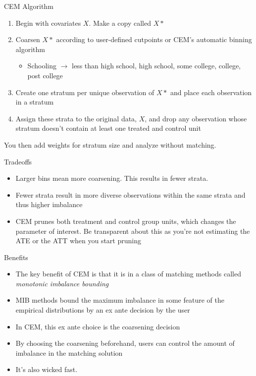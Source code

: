 \documentclass{beamer}
\begin{document}
\begin{frame}{CEM Algorithm}
	
\begin{enumerate}
\item Begin with covariates $X$. Make a copy called $X*$
\item Coarsen $X*$ according to user-defined cutpoints or CEM's automatic binning algorithm
	\begin{itemize}
	\item Schooling $\rightarrow$ less than high school, high school, some college, college, post college
	\end{itemize}
\item Create one stratum per unique observation of $X*$ and place each observation in a stratum
\item Assign these strata to the original data, $X$, and drop any observation whose stratum doesn't contain at least one treated and control unit
\end{enumerate}

You then add weights for stratum size and analyze without matching.

\end{frame}

\begin{frame}{Tradeoffs}
	
	\begin{itemize}
	\item Larger bins mean more coarsening.  This results in fewer strata.  
	\item Fewer strata result in more diverse observations within the same strata and thus higher imbalance
	\item CEM prunes both treatment and control group units, which changes the parameter of interest.  Be transparent about this as you're not estimating the ATE or the ATT when you start pruning
	\end{itemize}
	
\end{frame}

\begin{frame}{Benefits}
	
	\begin{itemize}
	\item The key benefit of CEM is that it is in a class of matching methods called \emph{monotonic imbalance bounding}
	\item MIB methods bound the maximum imbalance in some feature of the empirical distributions by an ex ante decision by the user
	\item In CEM, this ex ante choice is the coarsening decision
	\item By choosing the coarsening beforehand, users can control the amount of imbalance in the matching solution
	\item It's also wicked fast.
	\end{itemize}
\end{frame}
\end{document}
